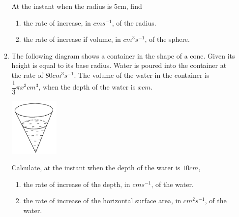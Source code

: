 \documentclass{report}
\begin{document}
\begin{multicols*}{2}
\begin{enumerate}
\begin{enumerate}
\begin{center}
                        \end{center}
                        At the instant when the radius is 5cm, find
                        \begin{enumerate}
                            \item the rate of increase, in $cm s^{-1}$, of the radius.
                            \item the rate of increase if volume, in $cm^3 s^{-1}$, of the sphere.
                        \end{enumerate}
                  \item The following diagram shows a container in the shape of a cone. Given its
                        height is equal to its base radius. Water is poured into the container at the
                        rate of $80\textit{cm}^3s^{-1}$. The volume of the water in the container is
                        $\dfrac{1}{3}\pi x^3\textit{cm}^3$, when the depth of the water is
                        $x\textit{cm}$.
                        \begin{center}
                            \includegraphics[width=0.2\textwidth]{./images/q31_2.jpeg}
                        \end{center}
                        Calculate, at the instant when the depth of the water is $10\textit{cm}$,
                        \begin{enumerate}
                            \item the rate of increase of the depth, in $\textit{cm} s^{-1}$, of the water.
                            \item the rate of increase of the horizontal surface area, in $\textit{cm}^2 s^{-1}$,
                                  of the water.
                        \end{enumerate}
              \end{enumerate}


\end{enumerate}
\end{multicols*}
\end{document}
